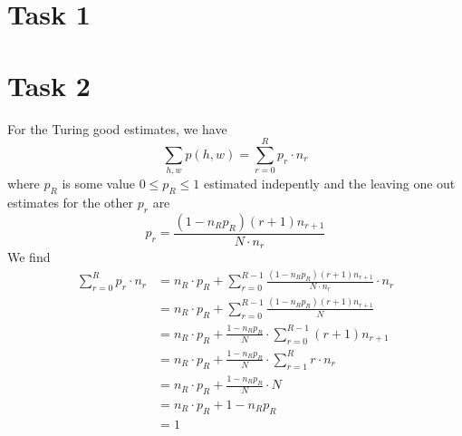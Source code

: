 \documentclass[%
   11pt,              %
   ngerman,           %
   a4paper,           %
   DIV11,             %
]{scrartcl}%
\begin{document}
\section*{Task 1}
\section*{Task 2}
For the Turing good estimates, we have
\begin{equation*}
	\sum_{h,w}p(h,w) = \sum_{r=0}^R p_r\cdot n_r
\end{equation*}
where $p_R$ is some value $0\leq p_R \leq 1$ estimated indepently and the leaving one out estimates for the other $p_r$ are
\begin{equation*}
	p_r = \frac{(1-n_R p_R) (r+1)n_{r+1}}{N\cdot n_r}
\end{equation*}
We find
\begin{align*}
	\sum_{r=0}^R p_r\cdot n_r &= n_R\cdot p_R + \sum_{r=0}^{R-1} \frac{(1-n_R p_R) (r+1)n_{r+1}}{N\cdot n_r} \cdot n_r \\
	&= n_R\cdot p_R + \sum_{r=0}^{R-1} \frac{(1-n_R p_R) (r+1)n_{r+1}}{N} \\
	&= n_R\cdot p_R + \frac{1-n_R p_R}{N} \cdot \sum_{r=0}^{R-1} (r+1)n_{r+1} \\
	&= n_R\cdot p_R + \frac{1-n_R p_R}{N} \cdot \sum_{r=1}^{R} r\cdot n_r \\
	&= n_R\cdot p_R + \frac{1-n_R p_R}{N} \cdot N \\
	&= n_R\cdot p_R + 1-n_R p_R\\
	&= 1
\end{align*}
\end{document}

